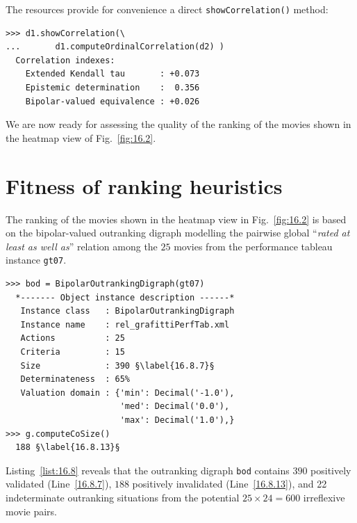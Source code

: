 The \Digraph resources provide for convenience a direct \texttt{showCorrela\-tion()} method:
\begin{lstlisting}
>>> d1.showCorrelation(\
...       d1.computeOrdinalCorrelation(d2) )
  Correlation indexes:
    Extended Kendall tau       : +0.073
    Epistemic determination    :  0.356
    Bipolar-valued equivalence : +0.026
\end{lstlisting}

We are now ready for assessing the quality of the \NetFlows ranking of the movies shown in the heatmap view of Fig.~\vref{fig:16.2}. 

\section{Fitness of ranking heuristics}
\label{sec:16.4}

The \NetFlows ranking of the movies shown in the heatmap view in Fig.~\vref{fig:16.2} is based on the bipolar-valued outranking digraph modelling the pairwise global ``\emph{rated at least as well as}'' relation among the $25$ movies from the performance tableau instance \texttt{gt07}.
\begin{lstlisting}[caption={The bipolar-valued outranking digraph of the star-rated movies},label=list:16.8]
>>> bod = BipolarOutrankingDigraph(gt07)
  *------- Object instance description ------*
   Instance class   : BipolarOutrankingDigraph
   Instance name    : rel_grafittiPerfTab.xml
   Actions          : 25
   Criteria         : 15
   Size             : 390 §\label{16.8.7}§
   Determinateness  : 65%
   Valuation domain : {'min': Decimal('-1.0'),
                       'med': Decimal('0.0'),
                       'max': Decimal('1.0'),}
>>> g.computeCoSize()
  188 §\label{16.8.13}§
\end{lstlisting}

Listing~\vref{list:16.8} reveals that the outranking digraph \texttt{bod} contains $390$ positively validated (Line~\ref{16.8.7}), $188$ positively invalidated (Line~\ref{16.8.13}), and 22 indeterminate outranking situations from the potential $25 \times 24 = 600$ irreflexive movie pairs.

